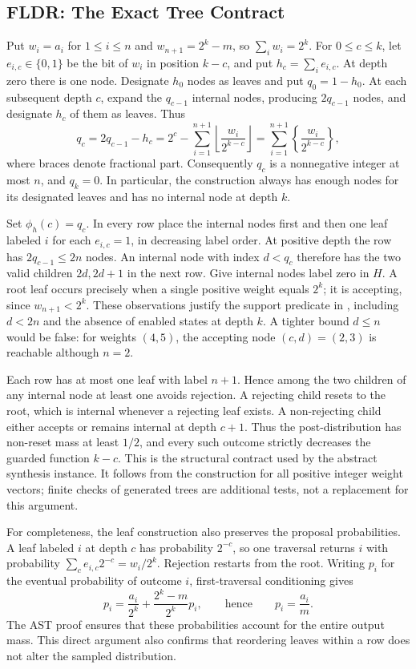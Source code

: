 \subsection{FLDR: The Exact Tree Contract}
Put $w_i=a_i$ for $1\leq i\leq n$ and $w_{n+1}=2^k-m$, so
$\sum_iw_i=2^k$. For $0\leq c\leq k$, let $e_{i,c}\in\{0,1\}$ be
the bit of $w_i$ in position $k-c$, and put $h_c=\sum_i e_{i,c}$.
At depth zero there is one node. Designate $h_0$ nodes as leaves and
put $q_0=1-h_0$. At each subsequent depth $c$, expand the $q_{c-1}$
internal nodes, producing $2q_{c-1}$ nodes, and designate $h_c$ of
them as leaves. Thus
\[
 q_c=2q_{c-1}-h_c
     =2^c-\sum_{i=1}^{n+1}
         \left\lfloor\frac{w_i}{2^{k-c}}\right\rfloor
     =\sum_{i=1}^{n+1}
         \left\{\frac{w_i}{2^{k-c}}\right\},
\]
where braces denote fractional part. Consequently $q_c$ is a
nonnegative integer at most $n$, and $q_k=0$. In particular, the
construction always has enough nodes for its designated leaves and
has no internal node at depth $k$.

Set $\phi_h(c)=q_c$. In every row place the internal nodes first and
then one leaf labeled $i$ for each $e_{i,c}=1$, in decreasing label
order. At positive depth the row has $2q_{c-1}\leq2n$ nodes.
An internal node with index $d<q_c$ therefore has the two valid children
$2d,2d+1$ in the next row. Give internal nodes label zero in $H$.
A root leaf occurs precisely when a single positive weight equals
$2^k$; it is accepting, since $w_{n+1}<2^k$.
These observations justify the support predicate in
, including $d<2n$ and the absence of enabled states at
depth $k$. A tighter bound $d\leq n$ would be false: for weights
$(4,5)$, the accepting node $(c,d)=(2,3)$ is reachable although $n=2$.

Each row has at most one leaf with label $n+1$. Hence among the two
children of any internal node at least one avoids rejection. A rejecting
child resets to the root, which is internal whenever a rejecting leaf
exists. A non-rejecting child either accepts or remains internal at
depth $c+1$. Thus the post-distribution has non-reset mass at least
$1/2$, and every such outcome strictly decreases the guarded function
$k-c$. This is the structural contract used by the abstract synthesis
instance. It follows from the construction for all positive integer
weight vectors; finite checks of generated trees are additional tests,
not a replacement for this argument.

For completeness, the leaf construction also preserves the proposal
probabilities. A leaf labeled $i$ at depth $c$ has probability $2^{-c}$,
so one traversal returns $i$ with probability
$\sum_c e_{i,c}2^{-c}=w_i/2^k$. Rejection restarts from the root.
Writing $p_i$ for the eventual probability of outcome $i$, first-traversal
conditioning gives
\[
 p_i=\frac{a_i}{2^k}+\frac{2^k-m}{2^k}p_i,
 \qquad\text{hence}\qquad p_i=\frac{a_i}{m}.
\]
The AST proof ensures that these probabilities account for the entire
output mass. This direct argument also confirms that reordering leaves
within a row does not alter the sampled distribution.

